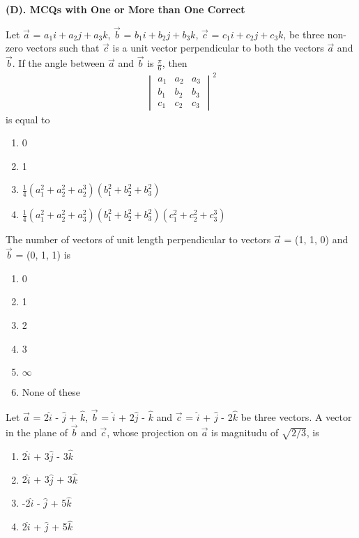 \textbf{(D). MCQs with One or More than One Correct}
\item Let $\overrightarrow{a}$ = $a_{1}i + a_{2}j + a_{3}k$, $\overrightarrow{b}$ = $b_{1}i + b_{2}j + b_{3}k$, $\overrightarrow{c}$ = $c_{1}i + c_{2}j + c_{3}k$, be three non-zero vectors such that $\overrightarrow{c}$ is a unit vector perpendicular to both the vectors $\overrightarrow{a}$ and $\overrightarrow{b}$. If the angle between $\overrightarrow{a}$ and $\overrightarrow{b}$ is $\frac{\pi}{6}$, then 
\begin{align*}
\begin{vmatrix} a_1 & a_2 & a_3 \\ b_1 & b_2 & b_3 \\ c_1 & c_2 & c_3  \end{vmatrix}^{2}
\end{align*}
is equal to
\begin{enumerate}
\item 0
\item 1
\item $\frac{1}{4}(a_1^{2} + a_2^{2} + a_2^{3})(b_1^{2} + b_2^{2} + b_3^{2})$
\item $\frac{1}{4}(a_1^{2} + a_2^{2} + a_3^{2})(b_1^{2} + b_2^{2} + b_3^{2})(c_1^{2} + c_2^{2} + c_3^{3})$
\end{enumerate}

\item The number of vectors of unit length perpendicular to vectors $\overrightarrow{a}$ = (1, 1, 0) and $\overrightarrow{b}$ = (0, 1, 1) is
\begin{enumerate}
\item 0
\item 1
\item 2
\item 3
\item $\infty$
\item None of these
\end{enumerate}

\item Let $\overrightarrow{a}$ = 2$\hat{i}$ - $\hat{j}$ + $\hat{k}$, $\overrightarrow{b}$ = $\hat{i}$ + $2\hat{j}$ - $\hat{k}$ and $\overrightarrow{c}$ = $\hat{i}$ + $\hat{j}$ - 2$\hat{k}$ be three vectors. A vector in the plane of $\overrightarrow{b}$ and $\overrightarrow{c}$, whose projection on $\overrightarrow{a}$ is magnitudu of $\sqrt{2/3}$, is
\begin{enumerate}
\item 2$\hat{i}$ + 3$\hat{j}$ - 3$\hat{k}$
\item 2$\hat{i}$ + 3$\hat{j}$ + 3$\hat{k}$
\item -2$\hat{i}$ - $\hat{j}$ + 5$\hat{k}$
\item 2$\hat{i}$ + $\hat{j}$ + 5$\hat{k}$
\end{enumerate}

